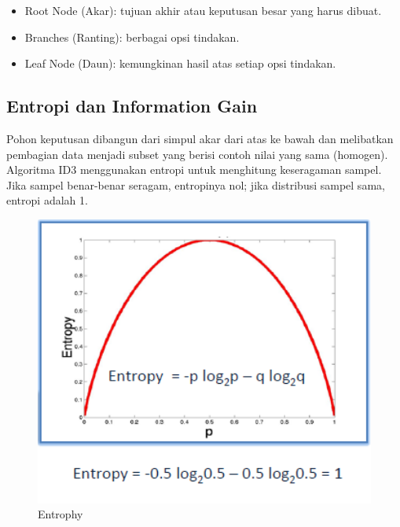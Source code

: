 \begin{itemize}
    \item Root Node (Akar): tujuan akhir atau keputusan besar yang harus dibuat.
    \item Branches (Ranting): berbagai opsi tindakan.
    \item Leaf Node (Daun): kemungkinan hasil atas setiap opsi tindakan.
\end{itemize}

\subsection{Entropi dan Information Gain}

\par Pohon keputusan dibangun dari simpul akar dari atas ke bawah dan melibatkan pembagian data menjadi subset yang berisi contoh nilai yang sama (homogen). Algoritma ID3 menggunakan entropi untuk menghitung keseragaman sampel. Jika sampel benar-benar seragam, entropinya nol; jika distribusi sampel sama, entropi adalah 1.\cite{entropi}

\begin{figure}[H]
    \centering
    \includegraphics[width=12cm]{figures/chapter2/9.png}
    \caption{Entrophy}
\end{figure}

